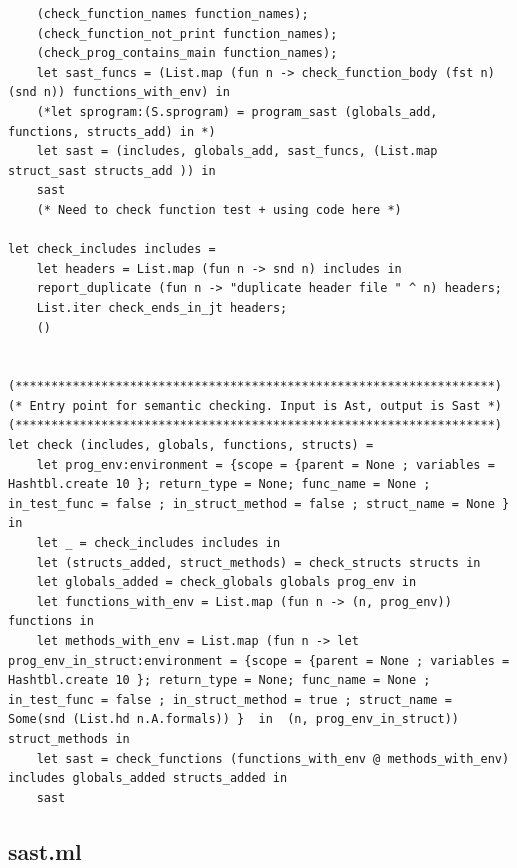\documentclass{article}
\begin{document}
\begin{lstlisting}
	(check_function_names function_names); 
	(check_function_not_print function_names); 
	(check_prog_contains_main function_names); 
	let sast_funcs = (List.map (fun n -> check_function_body (fst n) (snd n)) functions_with_env) in
	(*let sprogram:(S.sprogram) = program_sast (globals_add, functions, structs_add) in *)
	let sast = (includes, globals_add, sast_funcs, (List.map struct_sast structs_add )) in
	sast
	(* Need to check function test + using code here *)

let check_includes includes = 
	let headers = List.map (fun n -> snd n) includes in
	report_duplicate (fun n -> "duplicate header file " ^ n) headers;
	List.iter check_ends_in_jt headers;
	()
	

(*******************************************************************)
(* Entry point for semantic checking. Input is Ast, output is Sast *)
(*******************************************************************)
let check (includes, globals, functions, structs) =  
	let prog_env:environment = {scope = {parent = None ; variables = Hashtbl.create 10 }; return_type = None; func_name = None ; in_test_func = false ; in_struct_method = false ; struct_name = None } in
	let _ = check_includes includes in
	let (structs_added, struct_methods) = check_structs structs in
	let globals_added = check_globals globals prog_env in
	let functions_with_env = List.map (fun n -> (n, prog_env)) functions in
	let methods_with_env = List.map (fun n -> let prog_env_in_struct:environment = {scope = {parent = None ; variables = Hashtbl.create 10 }; return_type = None; func_name = None ; in_test_func = false ; in_struct_method = true ; struct_name = Some(snd (List.hd n.A.formals)) }  in  (n, prog_env_in_struct)) struct_methods in
	let sast = check_functions (functions_with_env @ methods_with_env) includes globals_added structs_added in
	sast

\end{lstlisting}

\newpage
\subsection{sast.ml}
\end{document}
